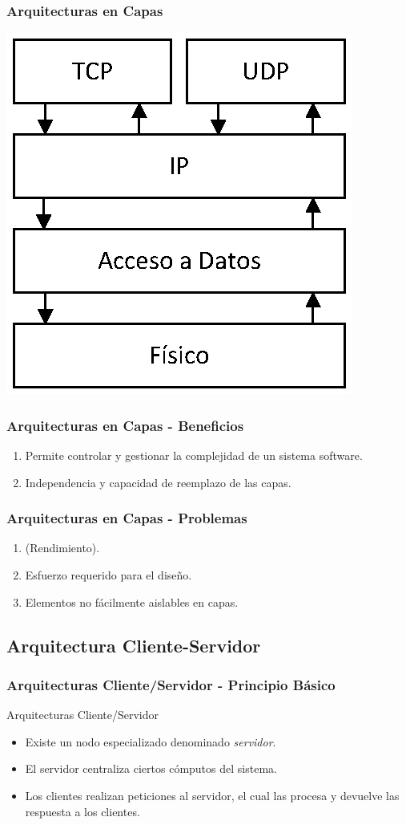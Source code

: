 \documentclass[a4paper,t,xcolor=pst,dvips,colortheme]{beamer}
\begin{document}
\begin{frame}[c]
	\frametitle{Arquitecturas en Capas}
	\begin{center}
        \includegraphics[width=.5\linewidth,keepaspectratio=true]{images/patterns/layered01.eps}
	\end{center}
\end{frame}

\begin{frame}[c]
    \frametitle{Arquitecturas en Capas - Beneficios}
    \begin{enumerate}[<+->]
        \item Permite controlar y gestionar la complejidad de un sistema software.
        \item Independencia y capacidad de reemplazo de las capas.
    \end{enumerate}
\end{frame}

\begin{frame}[c]
    \frametitle{Arquitecturas en Capas - Problemas}
    \begin{enumerate}[<+->]
        \item (Rendimiento).
        \item Esfuerzo requerido para el diseño.
        \item Elementos no fácilmente aislables en capas.
    \end{enumerate}
\end{frame}

\subsection{Arquitectura Cliente-Servidor}

\begin{frame}[c]
    \frametitle{Arquitecturas Cliente/Servidor - Principio Básico}
    \begin{block}{Arquitecturas Cliente/Servidor}
        \begin{itemize}[<+->]
            \item Existe un nodo especializado denominado \emph{servidor}.
            \item El servidor centraliza ciertos cómputos del sistema.
            \item Los clientes realizan peticiones al servidor, el cual las procesa y devuelve las respuesta a los clientes.
        \end{itemize}
    \end{block}
\end{frame}
\end{document}
